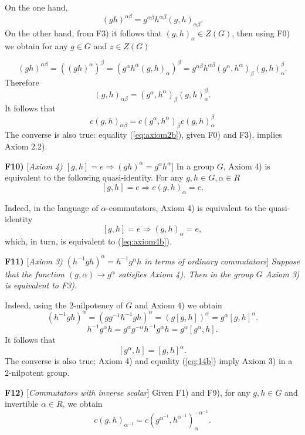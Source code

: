 \documentclass[11pt]{article}
\theoremstyle{definition}
\begin{document}
On the one hand,
$$
(gh)^{\alpha\beta}=g^{\alpha\beta} h^{\alpha\beta}(g,h)_{\alpha\beta}.
$$
On the other hand, from F3) it follows that $(g,h)_\alpha \in Z(G)$, then using F0) we obtain for any $g \in G$ and $z \in Z(G)$

$$
(gh)^{\alpha\beta}=((gh)^\alpha)^\beta=(g^\alpha h^\alpha (g,h)_\alpha)^\beta=g^{\alpha\beta} h^{\alpha \beta} (g^\alpha,h^\alpha)_\beta (g,h)_\alpha^\beta.
$$
Therefore
\begin{equation}\label{eq:(2)}
(g,h)_{\alpha \beta}=(g^\alpha,h^\alpha)_\beta (g,h)_\alpha^\beta.
\end{equation}
It follows that
\begin{equation} \label{eq:axiom2b} 
c(g,h)_{\alpha\beta} = c(g^{\alpha},h^{\alpha})_\beta c(g,h)_{\alpha}^{\beta}
\end{equation}
The converse is also true: equality (\ref{eq:axiom2b}), given F0) and F3), implies Axiom 2.2).

\medskip
\noindent
{\bf F10)} [{\it Axiom 4) $[g,h] = e \Rightarrow (gh)^\alpha = g^\alpha h^\alpha$}] In a group $G$, Axiom 4) is equivalent to the following quasi-identity. For any $g,h \in G, \alpha \in R$
\begin{equation} \label{eq:axiom4b}
[g,h] = e \Rightarrow c(g,h)_\alpha = e.
\end{equation}

Indeed, in the language of $\alpha$-commutators, Axiom 4) is equivalent to the quasi-identity
$$
[g,h] = e \Rightarrow (g,h)_\alpha = e,
$$
which, in turn, is equivalent to (\ref{eq:axiom4b}).

\medskip
\noindent
{\bf F11)} [{\it Axiom 3) $(h^{-1}gh)^\alpha = h^{-1}g^\alpha h$ in terms of ordinary commutators}] {\it Suppose that the function $(g,\alpha) \to g^\alpha$ satisfies Axiom 4). Then in the group $G$ Axiom 3) is equivalent to F3).}

Indeed, using the 2-nilpotency of $G$ and Axiom 4) we obtain
$$
(h^{-1}gh)^\alpha = (gg^{-1}h^{-1}gh)^\alpha = (g[g,h])^\alpha = g^\alpha[g,h]^\alpha.
$$
$$
h^{-1}g^\alpha h = g^\alpha g^{-\alpha}h^{-1}g^\alpha h = g^\alpha[g^\alpha,h].
$$
It follows that
\begin{equation} \label{eq:14b}
[g^\alpha,h] = [g,h]^\alpha.
\end{equation}
The converse is also true: Axiom 4) and equality (\ref{eq:14b}) imply Axiom 3) in a 2-nilpotent group.

\medskip
\noindent
{\bf F12)} [{\it  Commutators with inverse scalar}]  Given F1) and F9), for any $g, h \in G$ and invertible $\alpha \in R$, we obtain
\begin{equation}\label{eq:(4b)}
    c(g,h)_{\alpha^{-1}}=c(g^{\alpha^{-1}},h^{\alpha^{-1}})_\alpha^{-\alpha^{-1}}.
\end{equation}
\end{document}
